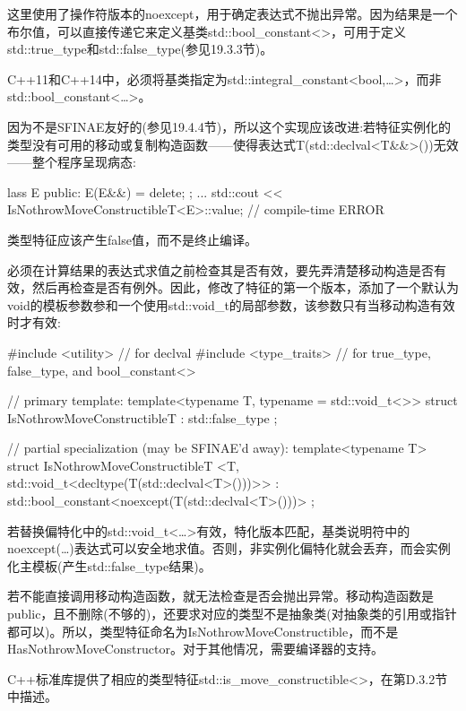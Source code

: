 这里使用了操作符版本的noexcept，用于确定表达式不抛出异常。因为结果是一个布尔值，可以直接传递它来定义基类std::bool\_constant<>，可用于定义std::true\_type和std::false\_type(参见19.3.3节)。

\begin{notice}C++11和C++14中，必须将基类指定为std::integral\_constant<bool,…>，而非std::bool\_constant<…>。
\end{notice}

因为不是SFINAE友好的(参见19.4.4节)，所以这个实现应该改进:若特征实例化的类型没有可用的移动或复制构造函数——使得表达式T(std::declval<T\&\&>())无效——整个程序呈现病态:

\begin{cpp}
lass E {
	public:
	E(E&&) = delete;
};
...
std::cout << IsNothrowMoveConstructibleT<E>::value; // compile-time ERROR
\end{cpp}

类型特征应该产生false值，而不是终止编译。

必须在计算结果的表达式求值之前检查其是否有效，要先弄清楚移动构造是否有效，然后再检查是否有例外。因此，修改了特征的第一个版本，添加了一个默认为void的模板参数参和一个使用std::void\_t的局部参数，该参数只有当移动构造有效时才有效:

\begin{cpp}
#include <utility> // for declval
#include <type_traits> // for true_type, false_type, and bool_constant<>

// primary template:
template<typename T, typename = std::void_t<>>
struct IsNothrowMoveConstructibleT : std::false_type
{
};

// partial specialization (may be SFINAE’d away):
template<typename T>
struct IsNothrowMoveConstructibleT
		<T, std::void_t<decltype(T(std::declval<T>()))>>
: std::bool_constant<noexcept(T(std::declval<T>()))>
{
};
\end{cpp}

若替换偏特化中的std::void\_t<…>有效，特化版本匹配，基类说明符中的noexcept(…)表达式可以安全地求值。否则，非实例化偏特化就会丢弃，而会实例化主模板(产生std::false\_type结果)。

若不能直接调用移动构造函数，就无法检查是否会抛出异常。移动构造函数是public，且不删除(不够的)，还要求对应的类型不是抽象类(对抽象类的引用或指针都可以)。所以，类型特征命名为IsNothrowMoveConstructible，而不是HasNothrowMoveConstructor。对于其他情况，需要编译器的支持。 

C++标准库提供了相应的类型特征std::is\_move\_constructible<>，在第D.3.2节中描述。

